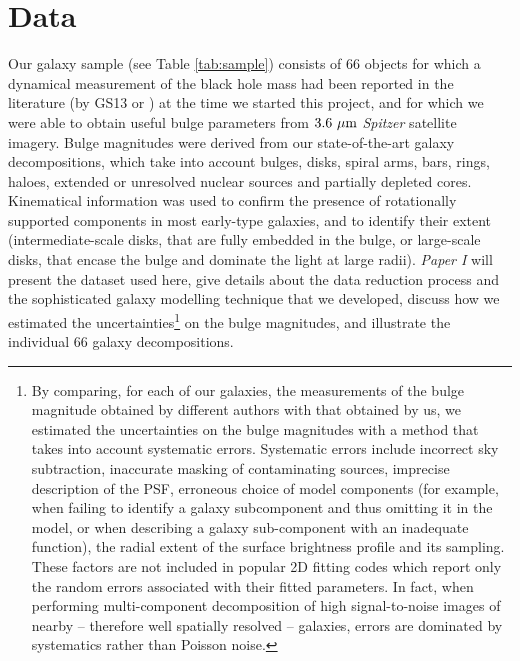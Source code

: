 \documentclass[preprint2]{emulateapj}
\begin{document}
\section{Data}
\label{sec:data}
Our galaxy sample (see Table \ref{tab:sample}) 
consists of 66 objects for which a dynamical measurement of the black hole mass had been reported in the literature 
(by GS13 or \citealt{rusli2013bhmassesDM}) at the time we started this project, 
and for which we were able to obtain useful bulge parameters from $3.6\rm~\mu m$ \emph{Spitzer} satellite imagery. 
Bulge magnitudes were derived from our state-of-the-art galaxy decompositions, which take into account 
bulges, disks, spiral arms, bars, rings, haloes, extended or unresolved nuclear sources and partially depleted cores.
Kinematical information \citep{atlas3dIII-MNRAS,scott2014,arnold2014} was used 
to confirm the presence of rotationally supported components in most early-type galaxies, 
and to identify their extent 
(intermediate-scale disks, that are fully embedded in the bulge, 
or large-scale disks, that encase the bulge and dominate the light at large radii). 
\emph{Paper I} will present the dataset used here, 
give details about the data reduction process and the sophisticated galaxy modelling technique that we developed, 
discuss how we estimated the uncertainties\footnote{By comparing, for each of our galaxies, the measurements of the bulge magnitude 
obtained by different authors with that obtained by us, we estimated the uncertainties on the bulge magnitudes 
with a method that takes into account systematic errors. 
Systematic errors include incorrect sky subtraction, inaccurate masking of contaminating sources, imprecise description of the PSF, 
erroneous choice of model components (for example, when failing to identify a galaxy subcomponent and thus omitting it in the model, 
or when describing a galaxy sub-component with an inadequate function), 
the radial extent of the surface brightness profile and its sampling. 
These factors are not included in popular 2D fitting codes which report only the random errors associated with their fitted parameters. 
In fact, when performing multi-component decomposition of high signal-to-noise images of nearby -- therefore well spatially resolved -- galaxies, 
errors are dominated by systematics rather than Poisson noise.} 
on the bulge magnitudes, and illustrate the individual 66 galaxy decompositions. \\
\end{document}
